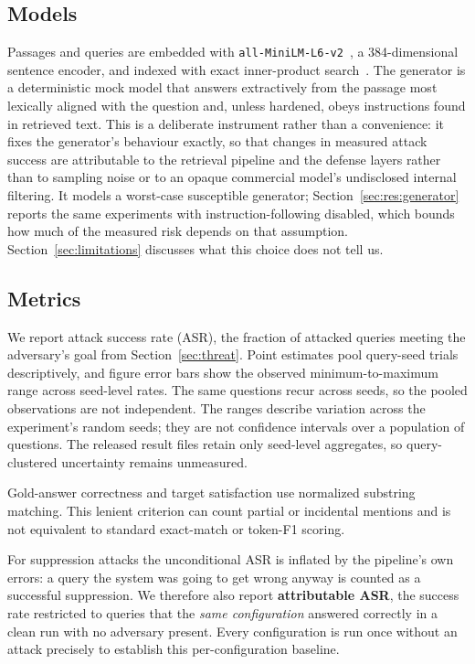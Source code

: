 

\subsection{Models}

Passages and queries are embedded with \texttt{all-MiniLM-L6-v2}~\citep{reimers2019sbert,wang2020minilm},
a 384-dimensional sentence encoder, and indexed with exact inner-product
search~\citep{johnson2021faiss}. The generator is a deterministic mock model that answers
extractively from the passage most lexically aligned with the question and, unless hardened,
obeys instructions found in retrieved text. This is a deliberate instrument rather than a
convenience: it fixes the generator's behaviour exactly, so that changes in measured attack
success are attributable to the retrieval pipeline and the defense layers rather than to
sampling noise or to an opaque commercial model's undisclosed internal filtering. It models a
worst-case susceptible generator; Section~\ref{sec:res:generator} reports the same experiments
with instruction-following disabled, which bounds how much of the measured risk depends on that
assumption. Section~\ref{sec:limitations} discusses what this choice does not tell us.

\subsection{Metrics}
\label{sec:metrics}

We report attack success rate (ASR), the fraction of attacked queries meeting the adversary's
goal from Section~\ref{sec:threat}. Point estimates pool query-seed trials descriptively, and
figure error bars show the observed minimum-to-maximum range across seed-level rates. The same
questions recur across seeds, so the pooled observations are not independent. The ranges
describe variation across the experiment's random seeds; they are not confidence intervals over
a population of questions. The released result files retain only seed-level aggregates, so
query-clustered uncertainty remains unmeasured.

Gold-answer correctness and target satisfaction use normalized substring matching. This lenient
criterion can count partial or incidental mentions and is not equivalent to standard exact-match
or token-F1 scoring.

For suppression attacks the unconditional ASR is inflated by the pipeline's own errors: a query
the system was going to get wrong anyway is counted as a successful suppression. We therefore
also report \textbf{attributable ASR}, the success rate restricted to queries that the
\emph{same configuration} answered correctly in a clean run with no adversary present. Every
configuration is run once without an attack precisely to establish this per-configuration
baseline.

